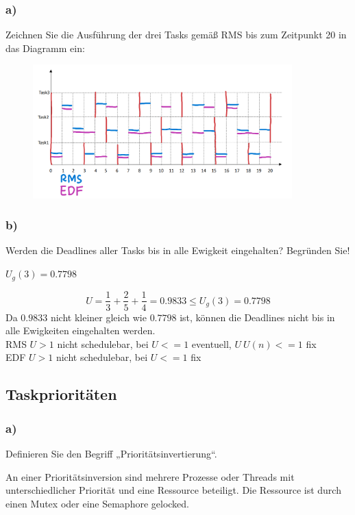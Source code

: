 \subsubsection{a)}
Zeichnen Sie die Ausführung der drei Tasks gemäß RMS bis zum Zeitpunkt 20 in das Diagramm ein: 

\begin{figure}[H]
  \includegraphics[width=10cm]{images/KA160322/3a.PNG}
  \centering
\end{figure}

\subsubsection{b)}
Werden die Deadlines aller Tasks bis in alle Ewigkeit eingehalten? Begründen Sie!

$U_g(3) = 0.7798$

\begin{equation}
  U = \frac{1}{3} + \frac{2}{5} + \frac{1}{4} = 0.9833 \leq U_g(3) = 0.7798
\end{equation}
Da $0.9833$ nicht kleiner gleich wie $0.7798$ ist, können die Deadlines nicht bis in alle Ewigkeiten eingehalten werden.\\

RMS $U > 1$ nicht schedulebar, bei $U <= 1$ eventuell, $U \ U(n) <= 1$ fix\\
EDF $U > 1$ nicht schedulebar, bei $U <= 1$ fix

\subsection{Taskprioritäten}
\subsubsection{a)}
Definieren Sie den Begriff „Prioritätsinvertierung“.

An einer Prioritätsinversion sind mehrere Prozesse oder Threads mit unterschiedlicher Priorität und eine Ressource beteiligt.
Die Ressource ist durch einen Mutex oder eine Semaphore gelocked.

